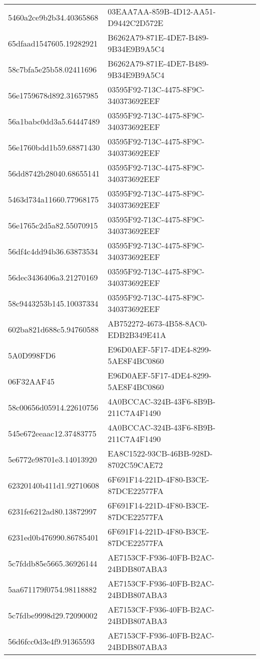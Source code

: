 \begin{tabular}{ll}
5460a2ce9b2b34.40365868 & 03EAA7AA-859B-4D12-AA51-D9442C2D572E \\
65dfaad1547605.19282921 & B6262A79-871E-4DE7-B489-9B34E9B9A5C4 \\
58c7bfa5e25b58.02411696 & B6262A79-871E-4DE7-B489-9B34E9B9A5C4 \\
56e1759678d892.31657985 & 03595F92-713C-4475-8F9C-340373692EEF \\
56a1babc0dd3a5.64447489 & 03595F92-713C-4475-8F9C-340373692EEF \\
56e1760bdd1b59.68871430 & 03595F92-713C-4475-8F9C-340373692EEF \\
56dd8742b28040.68655141 & 03595F92-713C-4475-8F9C-340373692EEF \\
5463d734a11660.77968175 & 03595F92-713C-4475-8F9C-340373692EEF \\
56e1765c2d5a82.55070915 & 03595F92-713C-4475-8F9C-340373692EEF \\
56df4c4dd94b36.63873534 & 03595F92-713C-4475-8F9C-340373692EEF \\
56dec3436406a3.21270169 & 03595F92-713C-4475-8F9C-340373692EEF \\
58c9443253b145.10037334 & 03595F92-713C-4475-8F9C-340373692EEF \\
602ba821d688c5.94760588 & AB752272-4673-4B58-8AC0-EDB2B349E41A \\
5A0D998FD6 & E96D0AEF-5F17-4DE4-8299-5AE8F4BC0860 \\
06F32AAF45 & E96D0AEF-5F17-4DE4-8299-5AE8F4BC0860 \\
58c00656d05914.22610756 & 4A0BCCAC-324B-43F6-8B9B-211C7A4F1490 \\
545e672eeaac12.37483775 & 4A0BCCAC-324B-43F6-8B9B-211C7A4F1490 \\
5e6772e98701e3.14013920 & EA8C1522-93CB-46BB-928D-8702C59CAE72 \\
62320140b411d1.92710608 & 6F691F14-221D-4F80-B3CE-87DCE22577FA \\
6231fe6212ad80.13872997 & 6F691F14-221D-4F80-B3CE-87DCE22577FA \\
6231ed0b476990.86785401 & 6F691F14-221D-4F80-B3CE-87DCE22577FA \\
5c7fddb85e5665.36926144 & AE7153CF-F936-40FB-B2AC-24BDB807ABA3 \\
5aa671179f0754.98118882 & AE7153CF-F936-40FB-B2AC-24BDB807ABA3 \\
5c7fdbe9998d29.72090002 & AE7153CF-F936-40FB-B2AC-24BDB807ABA3 \\
56d6fcc0d3e4f9.91365593 & AE7153CF-F936-40FB-B2AC-24BDB807ABA3 \\

\end{tabular}
